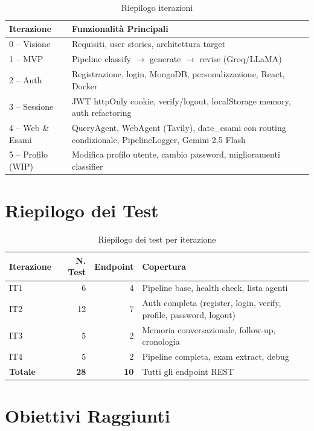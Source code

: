 \documentclass[a4paper,12pt]{report}
\begin{document}
\begin{table}[H]
\centering
\small
\begin{tabularx}{\textwidth}{l X}
\toprule
\textbf{Iterazione} & \textbf{Funzionalità Principali} \\
\midrule
0 -- Visione & Requisiti, user stories, architettura target \\
1 -- MVP & Pipeline classify $\rightarrow$ generate $\rightarrow$ revise (Groq/LLaMA) \\
2 -- Auth & Registrazione, login, MongoDB, personalizzazione, React, Docker \\
3 -- Sessione & JWT httpOnly cookie, verify/logout, localStorage memory, auth refactoring \\
4 -- Web \& Esami & QueryAgent, WebAgent (Tavily), date\_esami con routing condizionale, PipelineLogger, Gemini 2.5 Flash \\
5 -- Profilo (WIP) & Modifica profilo utente, cambio password, miglioramenti classifier \\
\bottomrule
\end{tabularx}
\caption{Riepilogo iterazioni}
\end{table}

\section{Riepilogo dei Test}

\begin{table}[H]
\centering
\begin{tabularx}{\textwidth}{l r r X}
\toprule
\textbf{Iterazione} & \textbf{N. Test} & \textbf{Endpoint} & \textbf{Copertura} \\
\midrule
IT1 & 6 & 4 & Pipeline base, health check, lista agenti \\
IT2 & 12 & 7 & Auth completa (register, login, verify, profile, password, logout) \\
IT3 & 5 & 2 & Memoria conversazionale, follow-up, cronologia \\
IT4 & 5 & 2 & Pipeline completa, exam extract, debug \\
\midrule
\textbf{Totale} & \textbf{28} & \textbf{10} & Tutti gli endpoint REST \\
\bottomrule
\end{tabularx}
\caption{Riepilogo dei test per iterazione}
\end{table}

\section{Obiettivi Raggiunti}
\end{document}
